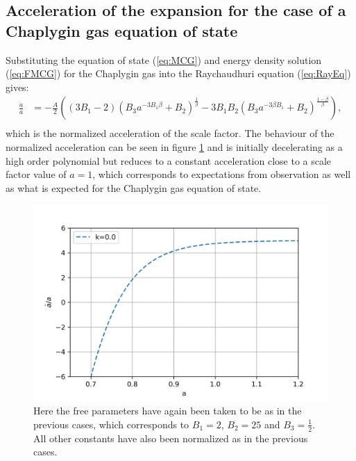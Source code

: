 \documentclass[a4paper, 11pt]{FSKH_623_Report}
\numberwithin{equation}{section}
\newcommand{\brac}[1]{\left(#1\right)}
\begin{document}
\subsection{Acceleration of the expansion for the case of a Chaplygin gas equation of state}
Substituting the equation of state (\ref{eq:MCG}) and energy density solution (\ref{eq:FMCG}) for the Chaplygin gas into the Raychaudhuri equation (\ref{eq:RayEq}) gives:
\begin{equation}\label{eq:ChRaych}
\begin{split}
\frac{\ddot{a}}{a} &= -\frac{A}{2}\brac{\brac{3B_{1}-2}\brac{B_{3}a^{-3B_{1}\beta}+B_{2}}^{\frac{1}{\beta}}-3B_{1}B_{2}\brac{B_{3}a^{-3\beta B_{1}}+B_{2}}^{\frac{1-\beta}{\beta}}},\\
\end{split}
\end{equation}
which is the normalized acceleration of the scale factor. The behaviour of the normalized acceleration can be seen in figure \ref{fig:ChAcc} and is initially decelerating as a high order polynomial but reduces to a constant acceleration close to a scale factor value of $a=1$, which corresponds to expectations from observation as well as what is expected for the Chaplygin gas equation of state.

\begin{figure}[H]
\centering
\includegraphics[scale=0.9]{Figures/ch_ddota.jpg}
\caption{Here the free parameters have again been taken to be as in the previous cases, which corresponds to $B_{1}=2$, $B_{2}=25$ and $B_{3}=\frac{1}{2}$. All other constants have also been normalized as in the previous cases.}
\label{fig:ChAcc}
\end{figure}
\end{document}
